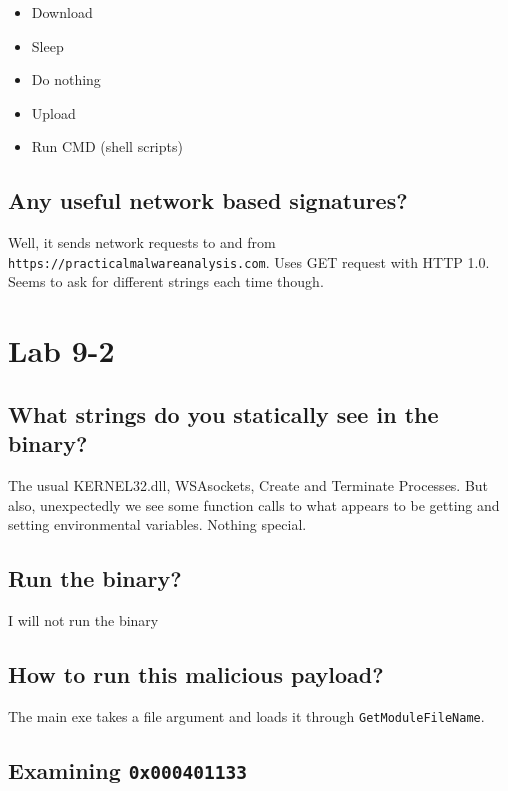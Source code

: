 \documentclass[11pt]{article}
\begin{document}
\begin{itemize}
\item Download
\item Sleep
\item Do nothing
\item Upload
\item Run CMD (shell scripts)
\end{itemize}

\subsection{Any useful network based signatures?}
\label{sec:org8792afd}
Well, it sends network requests to and from \texttt{https://practicalmalwareanalysis.com}. Uses GET request 
with HTTP 1.0. Seems to ask for different strings each time though.

\section{Lab 9-2}
\label{sec:org3657677}

\subsection{What strings do you statically see in the binary?}
\label{sec:orgf42d778}
The usual KERNEL32.dll, WSAsockets, Create and Terminate Processes. But also, unexpectedly
we see some function calls to what appears to be getting and setting environmental variables.
Nothing special.

\subsection{Run the binary?}
\label{sec:org2874018}

I will not run the binary

\subsection{How to run this malicious payload?}
\label{sec:orgf00c4d6}

The main exe takes a file argument and loads it through \texttt{GetModuleFileName}. 

\subsection{Examining \texttt{0x000401133}}
\label{sec:org144ae97}
\end{document}
